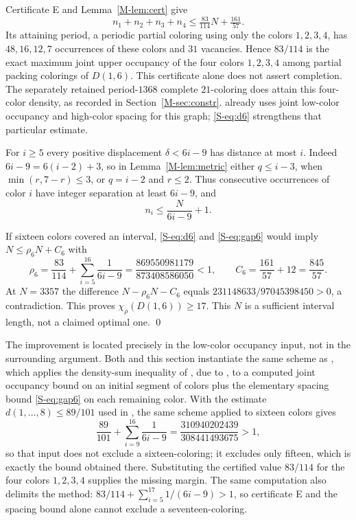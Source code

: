 \documentclass[11pt,reqno]{amsart}
\theoremstyle{plain}
\newcommand{\D}[1]{D(1,#1)}
\newcommand{\chirho}{\chi_{\rho}}
\theoremstyle{plain}
\theoremstyle{plain}
\begin{document}
Certificate E and Lemma~\ref*{M-lem:cert} give
\begin{equation}\label{S-eq:d6}
n_1 + n_2 + n_3 + n_4 \le \tfrac{83}{114} N + \tfrac{161}{57}.
\end{equation}
Its attaining period, a periodic partial coloring using only the colors $1,2,3,4$, has
$48,16,12,7$ occurrences of these colors and $31$ vacancies. Hence $83/114$ is the exact maximum
joint upper occupancy of the four colors $1,2,3,4$ among partial packing colorings of $\D{6}$.
This certificate alone does not assert completion. The separately retained
period-$1368$ complete $21$-coloring does attain this four-color density,
as recorded in Section~\ref*{M-sec:constr}. \cite[Lemma~8]{S-EHL12} already uses joint low-color occupancy and
high-color spacing for this graph; \eqref{S-eq:d6} strengthens that particular
estimate.

For $i \ge 5$ every positive displacement $\delta < 6i-9$ has distance at most
$i$. Indeed $6i-9 = 6(i-2)+3$, so in Lemma~\ref*{M-lem:metric} either $q \le i-3$,
when $\min(r,7-r) \le 3$, or $q = i-2$ and $r \le 2$. Thus consecutive
occurrences of color $i$ have integer separation at least $6i-9$, and
\begin{equation}\label{S-eq:gap6}
n_i \le \frac{N}{6i-9} + 1 .
\end{equation}

If sixteen colors covered an interval, \eqref{S-eq:d6} and \eqref{S-eq:gap6} would
imply $N \le \rho_6 N + C_6$ with
\[
\rho_6 = \frac{83}{114} + \sum_{i=5}^{16} \frac{1}{6i-9}
       = \frac{869550981179}{873408586050} < 1, \qquad
C_6 = \frac{161}{57} + 12 = \frac{845}{57}.
\]
At $N = 3357$ the difference $N - \rho_6 N - C_6$ equals
$231148633/97045398450 > 0$, a contradiction. This proves
$\chirho(\D{6}) \ge 17$. This $N$ is a sufficient interval length, not a
claimed optimal one. \qed

The improvement is located precisely in the low-color occupancy input, not in
the surrounding argument. Both \cite{S-SV15} and this section instantiate the
same scheme as \cite[proof of Lemma~8]{S-EHL12}, which applies the density-sum
inequality of \cite[Lemma~7]{S-EHL12}, due to \cite{S-FKL09}, to a computed joint
occupancy bound on an initial segment of colors plus the elementary spacing
bound \eqref{S-eq:gap6} on each remaining color. With the estimate
$d(1,\dots,8) \le 89/101$ used in
\cite{S-SV15}, the same scheme applied to sixteen colors gives
\[
\frac{89}{101} + \sum_{i=9}^{16} \frac{1}{6i-9}
 = \frac{310940202439}{308441493675} > 1 ,
\]
so that input does not exclude a sixteen-coloring; it excludes only fifteen,
which is exactly the bound obtained there. Substituting the certified value
$83/114$ for the four colors $1,2,3,4$ supplies the missing margin. The same
computation also delimits the method:
$83/114 + \sum_{i=5}^{17} 1/(6i-9) > 1$, so certificate E and the spacing bound
alone cannot exclude a seventeen-coloring.
\end{document}
